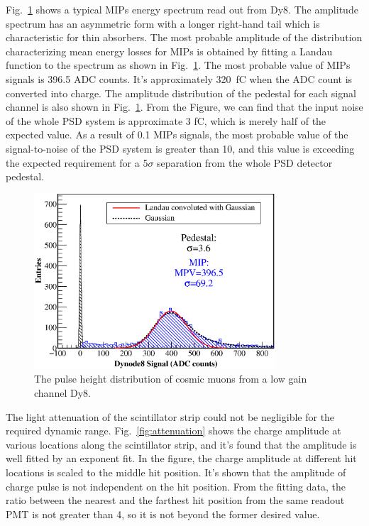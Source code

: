 \documentclass[5p, times]{elsarticle}
\begin{document}
Fig.~\ref{fig:mip} shows a typical MIPs energy spectrum read out from Dy8. 
The amplitude spectrum has an asymmetric form with a longer right-hand tail which is characteristic for thin absorbers. 
The most probable amplitude of the distribution characterizing mean energy losses for MIPs is obtained by fitting a Landau function to the spectrum as shown in Fig.~\ref{fig:mip}. 
The most probable value of MIPs signals is 396.5 ADC counts. 
It’s approximately \SI{320}{\femto\coulomb} when the ADC count is converted into charge. 
The amplitude distribution of the pedestal for each signal channel is also shown in Fig.~\ref{fig:mip}.
From the Figure, we can find that the input noise of the whole PSD system is approximate 3 fC, which is merely half of the expected value. 
As a result of 0.1 MIPs signals, the most probable value of the signal-to-noise of the PSD system is greater than 10, and this value is exceeding the expected requirement for a 5$\sigma $ separation from the whole PSD detector pedestal.

\begin{figure}
 \centering
 \includegraphics[width=90mm]{mip}
\caption{The pulse height distribution of cosmic muons from a low gain channel Dy8.}
\label{fig:mip}
\end{figure} 

The light attenuation of the scintillator strip could not be negligible for the required dynamic range. 
Fig.~\ref{fig:attenuation} shows the charge amplitude at various locations along the scintillator strip, and it’s found that the amplitude is well fitted by an exponent fit. 
In the figure, the charge amplitude at different hit locations is scaled to the middle hit position. 
It’s shown that the amplitude of charge pulse is not independent on the hit position. 
From the fitting data, the ratio between the nearest and the farthest hit position from the same readout PMT is not greater than 4, so it is not beyond the former desired value.
\end{document}
